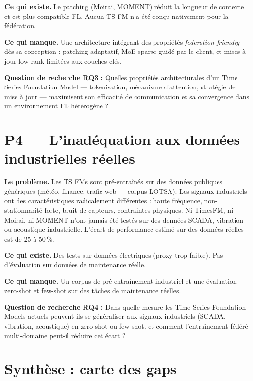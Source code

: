 \documentclass[12pt, a4paper]{report}
\begin{document}
\textbf{Ce qui existe.} Le patching (Moirai, MOMENT) réduit la longueur de contexte
et est plus compatible FL. Aucun TS FM n'a été conçu nativement pour la fédération.

\textbf{Ce qui manque.} Une architecture intégrant des propriétés \textit{federation-friendly}
dès sa conception : patching adaptatif, MoE sparse guidé par le client, et mises à
jour low-rank limitées aux couches clés.

\begin{infobox}
\textbf{Question de recherche RQ3 :} Quelles propriétés architecturales d'un Time Series
Foundation Model — tokenisation, mécanisme d'attention, stratégie de mise à jour — maximisent
son efficacité de communication et sa convergence dans un environnement FL hétérogène ?
\end{infobox}

\section{P4 — L'inadéquation aux données industrielles réelles}

\textbf{Le problème.} Les TS FMs sont pré-entraînés sur des données publiques génériques
(météo, finance, trafic web — corpus LOTSA). Les signaux industriels ont des
caractéristiques radicalement différentes : haute fréquence, non-stationnarité forte,
bruit de capteurs, contraintes physiques. Ni TimesFM, ni Moirai, ni MOMENT n'ont
jamais été testés sur des données SCADA, vibration ou acoustique industrielle.
L'écart de performance estimé sur des données réelles est de 25 à 50\,\%.

\textbf{Ce qui existe.} Des tests sur données électriques (proxy trop faible).
Pas d'évaluation sur données de maintenance réelle.

\textbf{Ce qui manque.} Un corpus de pré-entraînement industriel et une évaluation
zero-shot et few-shot sur des tâches de maintenance réelles.

\begin{infobox}
\textbf{Question de recherche RQ4 :} Dans quelle mesure les Time Series Foundation Models
actuels peuvent-ils se généraliser aux signaux industriels (SCADA, vibration, acoustique)
en zero-shot ou few-shot, et comment l'entraînement fédéré multi-domaine peut-il réduire
cet écart ?
\end{infobox}

\section{Synthèse : carte des gaps}
\end{document}
